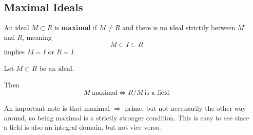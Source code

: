 \subsection{Maximal Ideals}
\begin{defn}
    An ideal $M \subset R$ is \textbf{maximal} if 
    $M \neq R$ and there is no ideal strictily between $M$ and 
    $R$, meaning 
    \[
        M \subset I \subset R
    \]
    implies $M = I$ or $R = I$.
\end{defn}
\begin{thm}
    Let $M \subset R$ be an ideal. 

    Then 
    \[
        M \ \text{maximal} \Leftrightarrow R/M \ \text{is a field}
    \]
\end{thm}

An important note is that maximal $\Rightarrow$ prime, but not 
necessarily the other way around, so being maximal is a strictly 
stronger condition. This is easy to see since a field 
is also an integral domain, but not vice versa.

\newpage 
